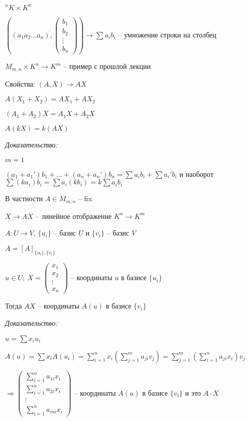 \documentclass[12pt]{article}
\begin{document}
$^nK \times K^n$

$((a_1a_2 \ldots a_n), \left( \begin{gathered}
    b_1 \\
    b_2 \\
    \vdots \\
    b_n
\end{gathered}\right)) \rightarrow \sum a_ib_i$ -- умножение строки на столбец

$M_{m, n} \times K^n \rightarrow K^m$ -- пример с прошлой лекции

\begin{theo}{Свойства:}
    $(A, X) \rightarrow AX$

    $A(X_1 + X_2) = AX_1 + AX_2$

    $(A_1 + A_2)X = A_1X + A_2X$

    $A(kX) = k(AX)$
\end{theo}

\textit{Доказательство:}

$m = 1$

$(a_1 + a_1')b_1 + \ldots + (a_n + a_n')b_n = \sum a_ib_i + \sum a_i'b_i$ и наоборот $\sum (ka_i)b_i = \sum a_i(kb_i) = k\sum a_ib_i$

В частности $A \in M_{m, n}$ -- fix

$X \rightarrow AX$ -- линейное отображение $K^n \rightarrow K^m$

\begin{lem}{}
    $A : U \rightarrow V$, $\{u_i\}$ -- базис $U$ и $\{v_i\}$ -- базис $V$

    $A = [A]_{\{u_i\}, \{v_i\}}$

    $u \in U;\ X = \begin{pmatrix}
        x_1 \\
        x_2 \\
        \vdots \\
        x_n
    \end{pmatrix}$ -- координаты $u$ в базисе $\{u_i\}$

    Тогда $AX$ -- координаты $A(u)$ в базисе $\{v_i\}$
\end{lem}

\textit{Доказательство:}

$u = \sum x_iu_i$

$A(u) = \sum x_iA(u_i) = \sum\limits_{i = 1}^n x_i(\sum\limits_{j = 1}^m a_{ji}v_j) = \sum\limits_{j = 1}^m (\sum\limits_{i = 1}^n a_{ji}x_i)v_j$

$\Rightarrow \begin{pmatrix}
    \sum\limits_{i = 1}^n a_{1i}x_i \\
    \sum\limits_{i = 1}^n a_{2i}x_i \\
    \vdots \\
    \sum\limits_{i = 1}^n a_{mi}x_i
\end{pmatrix}$ -- координаты $A(u)$ в базисе $\{v_i\}$ и это $A \cdot X$
\end{document}
